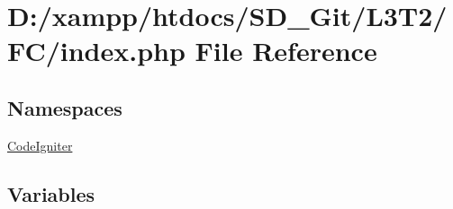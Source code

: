 \hypertarget{index_8php}{}\section{D\+:/xampp/htdocs/\+S\+D\+\_\+\+Git/\+L3\+T2/\+F\+C/index.php File Reference}
\label{index_8php}
\subsection*{Namespaces}
\begin{DoxyCompactItemize}
\item 
 \hyperlink{namespace_code_igniter}{Code\+Igniter}
\end{DoxyCompactItemize}
\subsection*{Variables}
